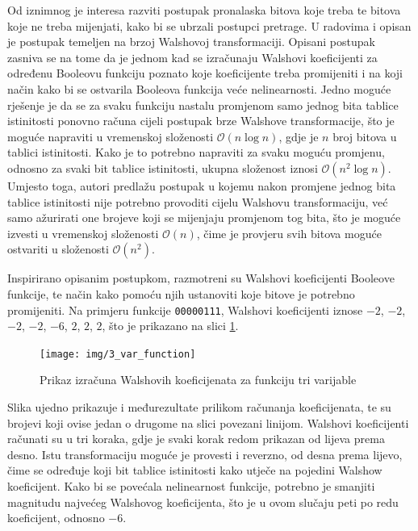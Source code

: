 Od iznimnog je interesa razviti postupak pronalaska bitova koje treba te bitova koje ne treba mijenjati, kako bi se ubrzali postupci pretrage.
U radovima \cite{millan1997smart} i \cite{millan1999boolean} opisan je postupak temeljen na brzoj Walshovoj transformaciji.
Opisani postupak zasniva se na tome da je jednom kad se izračunaju Walshovi koeficijenti za određenu Booleovu funkciju poznato koje koeficijente treba promijeniti i na koji način kako bi se ostvarila Booleova funkcija veće nelinearnosti.
Jedno moguće rješenje je da se za svaku funkciju nastalu promjenom samo jednog bita tablice istinitosti ponovno računa cijeli postupak brze Walshove transformacije, što je moguće napraviti u vremenskoj složenosti $\mathcal{O}(n\log n)$, gdje je $n$ broj bitova u tablici istinitosti.
Kako je to potrebno napraviti za svaku moguću promjenu, odnosno za svaki bit tablice istinitosti, ukupna složenost iznosi $\mathcal{O}(n^2\log n)$.
Umjesto toga, autori predlažu postupak u kojemu nakon promjene jednog bita tablice istinitosti nije potrebno provoditi cijelu Walshovu transformaciju, već samo ažurirati one brojeve koji se mijenjaju promjenom tog bita, što je moguće izvesti u vremenskoj složenosti $\mathcal{O}(n)$, čime je provjeru svih bitova moguće ostvariti u složenosti $\mathcal{O}(n^2)$.

Inspirirano opisanim postupkom, razmotreni su Walshovi koeficijenti Booleove funkcije, te način kako pomoću njih ustanoviti koje bitove je potrebno promijeniti.
Na primjeru funkcije \texttt{00000111}, Walshovi koeficijenti iznose $-2$, $-2$, $-2$, $-2$, $-6$, $2$, $2$, $2$, što je prikazano na slici \ref{fig:3_var_function}.
\begin{figure}[ht!] 
    \centering
    \texttt{[image: img/3\_var\_function]}
    \captionsetup{justification=centering}
    \caption{Prikaz izračuna Walshovih koeficijenata za funkciju tri varijable}
    \label{fig:3_var_function}
\end{figure}
Slika ujedno prikazuje i međurezultate prilikom računanja koeficijenata, te su brojevi koji ovise jedan o drugome na slici povezani linijom.
Walshovi koeficijenti računati su u tri koraka, gdje je svaki korak redom prikazan od lijeva prema desno.
Istu transformaciju moguće je provesti i reverzno, od desna prema lijevo, čime se određuje koji bit tablice istinitosti kako utječe na pojedini Walshow koeficijent.
Kako bi se povećala nelinearnost funkcije, potrebno je smanjiti magnitudu najvećeg Walshovog koeficijenta, što je u ovom slučaju peti po redu koeficijent, odnosno $-6$.

